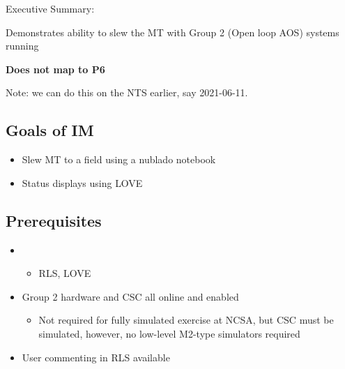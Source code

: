 
Executive Summary:

Demonstrates ability to slew the MT with Group 2 (Open loop AOS) systems running

\textbf{Does not map to P6}

Note: we can do this on the NTS earlier, say 2021-06-11.

\subsection{Goals of IM}
\begin{itemize}
\item Slew \gls{MT} to a field using a nublado notebook
\item Status displays using \gls{LOVE}
\end{itemize}

\subsection{Prerequisites}
\begin{itemize}
\item{}
  \begin{itemize}
  \item \gls{RLS}, \gls{LOVE}
  \end{itemize}
\item{Group 2 hardware and \gls{CSC} all online and enabled}
  \begin{itemize}
  \item Not required for fully simulated exercise at NCSA, but \gls{CSC} must be simulated,
    however, no low-level M2-type simulators required
  \end{itemize}
\item{User commenting in \gls{RLS} available}
\end{itemize}

